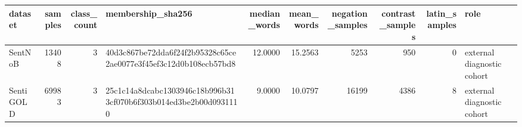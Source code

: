 \begin{tabular}{lrrlrrrrrl}
\toprule
dataset & samples & class\_count & membership\_sha256 & median\_words & mean\_words & negation\_samples & contrast\_samples & latin\_samples & role \\
\midrule
SentNoB & 13408 & 3 & 40d3c867be72dda6f24f2b95328c65ce2ae0077e3f45ef3c12d0b108ecb57bd8 & 12.0000 & 15.2563 & 5253 & 950 & 0 & external diagnostic cohort \\
SentiGOLD & 69983 & 3 & 25c1c14a8dcabc1303946c18b996b313cf070b6f303b014ed3be2b00d0931110 & 9.0000 & 10.0797 & 16199 & 4386 & 8 & external diagnostic cohort \\
\bottomrule
\end{tabular}
